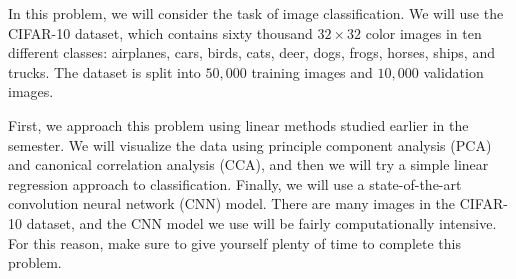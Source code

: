 \documentclass[preview]{standalone}
\begin{document}

In this problem, we will consider the task of image classification. 
We will use the CIFAR-10 dataset, which contains sixty thousand $32\times32$ color images in ten different classes: airplanes, cars, birds, cats, deer, dogs, frogs, horses, ships, and trucks. The dataset is split into $50,000$ training images and $10,000$ validation images.

First, we approach this problem using linear methods studied earlier in the semester.
We will visualize the data using principle component analysis (PCA) and canonical correlation analysis (CCA), and then we will try a simple linear regression approach to classification. 
Finally, we will use a state-of-the-art convolution neural network (CNN) model.
There are many images in the CIFAR-10 dataset, and the CNN model we use will be fairly computationally intensive. 
For this reason, make sure to give yourself plenty of time to complete this problem.
\end{document}
